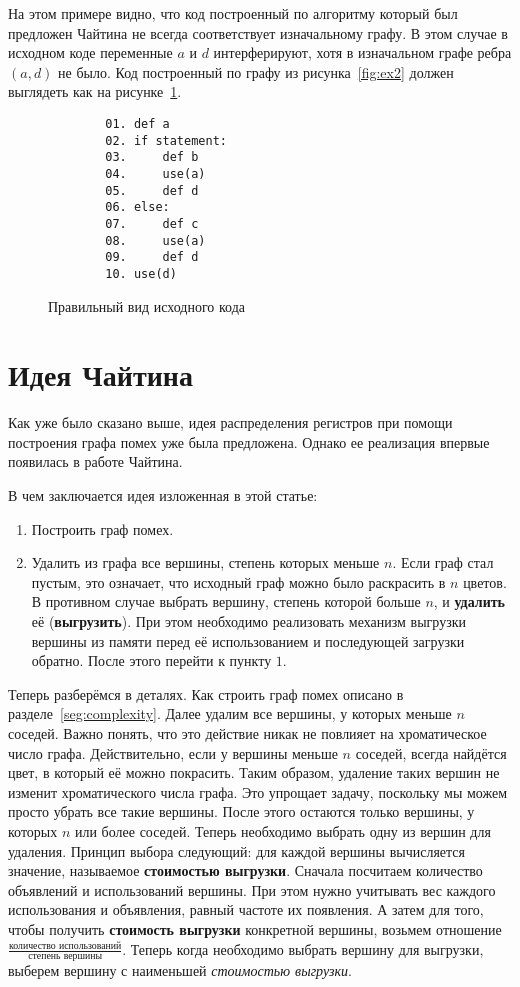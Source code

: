 \documentclass[12pt]{article}
\begin{document}
На этом примере видно, что код построенный по алгоритму который был предложен Чайтина не
всегда соответствует изначальному графу. В этом случае в исходном коде переменные
$a$ и $d$ интерферируют, хотя в изначальном графе ребра $(a, d)$ не было. Код построенный
по графу из рисунка~\ref{fig:ex2} должен выглядеть как на рисунке~\ref{fig:right_ex2}.

\begin{figure}[H]
    \centering
    \lstset{basicstyle=\ttfamily\small, frame=single}
    \begin{lstlisting}
        01. def a
        02. if statement:
        03.     def b
        04.     use(a)
        05.     def d 
        06. else:
        07.     def c
        08.     use(a)
        09.     def d
        10. use(d)
    \end{lstlisting}
    \caption{Правильный вид исходного кода}
    \label{fig:right_ex2}
\end{figure}

\section{Идея Чайтина}
Как уже было сказано выше, идея распределения регистров при помощи построения графа помех уже была
предложена. Однако ее реализация впервые появилась в работе Чайтина.

В чем заключается идея изложенная в этой статье:
\begin{enumerate}
    \item Построить граф помех.
    \item Удалить из графа все вершины, степень которых меньше $n$. Если граф стал пустым, это означает, что исходный
    граф можно было раскрасить в $n$ цветов. В противном случае выбрать вершину, степень которой больше $n$, и \textbf{удалить}
    её (\textbf{выгрузить}). При этом необходимо реализовать механизм выгрузки вершины из памяти перед её использованием и
    последующей загрузки обратно. После этого перейти к пункту $1$.
\end{enumerate}

Теперь разберёмся в деталях. Как строить граф помех описано в разделе~\ref{seg:complexity}. Далее удалим все вершины, у
которых меньше $n$ соседей. Важно понять, что это действие никак не повлияет на хроматическое число графа. Действительно,
если у вершины меньше $n$ соседей, всегда найдётся цвет, в который её можно покрасить. Таким образом, удаление таких вершин
не изменит хроматического числа графа. Это упрощает задачу, поскольку мы можем просто убрать все такие вершины. После этого
остаются только вершины, у которых $n$ или более соседей. Теперь необходимо выбрать одну из вершин для удаления. Принцип выбора
следующий: для каждой вершины вычисляется значение, называемое \textbf{стоимостью выгрузки}. Сначала посчитаем количество
объявлений и использований вершины. При этом нужно учитывать вес каждого использования и объявления, равный частоте их появления.
А затем для того, чтобы получить \textbf{стоимость выгрузки} конкретной вершины, возьмем отношение
$\frac{\textit{количество использований}}{\textit{степень вершины}}$. Теперь когда необходимо выбрать вершину для выгрузки,
выберем вершину с наименьшей \textit{стоимостью выгрузки}.
\end{document}
